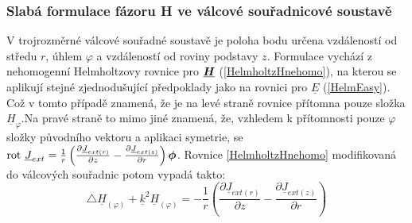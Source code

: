 \documentclass[12pt,a4paper,oneside]{article}
\numberwithin{equation}{section} %
\numberwithin{figure}{section} %
\numberwithin{table}{section} %
\renewcommand{\vec}[1]{\mbox{\boldmath$#1$}} %
\newcommand{\faz}[1]{{\underline{#1}}} %
\newcommand{\rot}{\mathrm{rot}\ }
\begin{document}
\subsubsection{Slabá formulace fázoru H ve válcové souřadnicové soustavě}

V trojrozměrné válcové souřadné soustavě je poloha bodu určena vzdáleností od středu $r$, úhlem $\varphi$ a vzdáleností od roviny podstavy $z$. Formulace vychází z nehomogenní Helmholtzovy rovnice pro $\faz{\vec{H}}$ (\ref{HelmholtzHnehomo}), na kterou se aplikují stejné zjednodušující předpoklady jako na rovnici pro $\faz{E}$ (\ref{HelmEasy}). Což v tomto případě znamená, že je na levé straně rovnice přítomna pouze složka $\faz{H} _{\varphi}$.Na pravé straně to mimo jiné znamená, že, vzhledem k přítomnosti pouze $\varphi$ složky původního vektoru a aplikaci symetrie, se $\rot \faz{J} _{ext} = \frac{1}{r} \left( \frac{\partial \faz{J} _{ext(r)}}{\partial z} - \frac{\partial \faz{J} _{ext(z)}}{\partial r} \right) \vec{\phi}$. Rovnice \ref{HelmholtzHnehomo} modifikovaná do válcových souřadnic potom vypadá takto:
\begin{equation}
\triangle \faz{H} _{(\varphi)} + \faz{k} ^2 \faz{H} _{(\varphi)} = - \frac{1}{r} \left(  \frac{\partial \faz{J} _{ext(r)}}{\partial z} - \frac{\partial \faz{J} _{ext(z)}}{\partial r} \right)
\end{equation}
\end{document}
